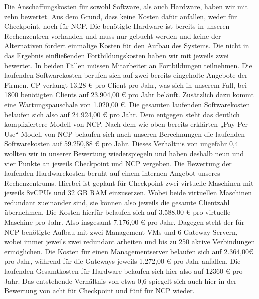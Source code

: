 Die Anschaffungskosten für sowohl Software, als auch Hardware, haben wir mit zehn bewertet. Aus dem Grund, dass keine Kosten dafür anfallen, weder für Checkpoint, noch für NCP. Die benötigte Hardware ist bereits in unseren Rechenzentren vorhanden und muss nur gebucht werden und keine der Alternativen fordert einmalige Kosten für den Aufbau des Systems. Die nicht in das Ergebnis einfließenden Fortbildungskosten haben wir mit jeweils zwei bewertet. In beiden Fällen müssen Mitarbeiter an Fortbildungen teilnehmen. Die laufenden Softwarekosten berufen sich auf zwei bereits eingeholte Angebote der Firmen. CP verlangt 13,28 € pro Client pro Jahr, was sich in unserem Fall, bei 1800 benötigten Clients auf 23.904,00 € pro Jahr beläuft. Zusätzlich dazu kommt eine Wartungspauschale von 1.020,00 €. Die gesamten laufenden Softwarekosten belaufen sich also auf 24.924,00 € pro Jahr. Dem entgegen steht das deutlich kompliziertere Modell von NCP. Nach dem wie oben bereits erklärten „Pay-Per-Use“-Modell von NCP belaufen sich nach unseren Berechnungen die laufenden Softwarekosten auf 59.250,88 € pro Jahr. Dieses Verhältnis von ungefähr 0,4 wollten wir in unserer Bewertung wiederspiegeln und haben deshalb neun und vier Punkte an jeweils Checkpoint und NCP vergeben. Die Bewertung der laufenden Hardwarekosten beruht auf einem internen Angebot unseres Rechenzentrums. Hierbei ist geplant für Checkpoint zwei virtuelle Maschinen mit jeweils 8vCPUs und 32 GB RAM einzusetzen. Wobei beide virtuellen Maschinen redundant zueinander sind, sie können also jeweils die gesamte Clientzahl übernehmen. Die Kosten hierfür belaufen sich auf 3.588,00 € pro virtuelle Maschine pro Jahr. Also insgesamt 7.176,00 € pro Jahr. Dagegen steht der für NCP benötigte Aufbau mit zwei Management-VMs und 6 Gateway-Servern, wobei immer jeweils zwei redundant arbeiten und bis zu 250 aktive Verbindungen ermöglichen. Die Kosten für einen Managementserver belaufen sich auf 2.364,00€ pro Jahr, während für die Gateways jeweils 1.272,00 € pro Jahr anfallen. Die laufenden Gesamtkosten für Hardware belaufen sich hier also auf 12360 € pro Jahr. Das entstehende Verhältnis von etwa 0,6 spiegelt sich auch hier in der Bewertung von acht für Checkpoint und fünf für NCP wieder.

